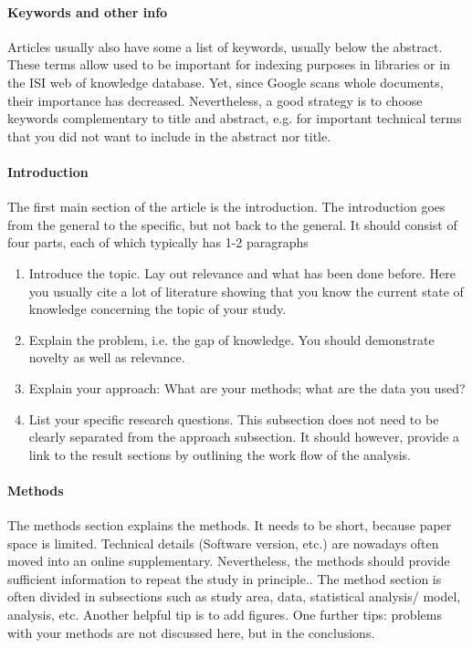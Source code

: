 \documentclass{tufte-book}
\begin{document}
\paragraph{Keywords and other info}Articles usually also have some a list of keywords, usually below the abstract. These terms allow used to be important for indexing purposes in libraries or in the ISI web of knowledge database. Yet, since Google scans whole documents, their importance has decreased. Nevertheless, a good strategy is to choose keywords complementary to title and abstract, e.g. for important technical terms that you did not want to include in the abstract nor title.


\paragraph{Introduction} The first main section of the article is the introduction. The introduction goes from the general to the specific, but not back to the general. It should consist of four parts, each of which typically has 1-2 paragraphs

\begin{enumerate}
\item Introduce the topic. Lay out relevance and what has been done before. Here you usually cite a lot of literature showing that you know the current state of knowledge concerning the topic of your study.
\item Explain the problem, i.e. the gap of knowledge. You should demonstrate novelty as well as relevance.
\item Explain your approach: What are your methods; what are the data you used?
\item List your specific research questions. This subsection does not need to be clearly separated from the approach subsection. It should however, provide a link to the result sections by outlining the work flow of the analysis.
\end{enumerate}

\paragraph{Methods} The methods section explains the methods. It needs to be short, because paper space is limited. Technical details (Software version, etc.) are nowadays often moved into an online supplementary. Nevertheless, the methods should provide sufficient information to repeat the study in principle.. The method section is often divided in subsections such as study area, data, statistical analysis/ model, analysis, etc. Another helpful tip is to add figures. One further tips: problems with your methods are not discussed here, but in the conclusions. 
\end{document}
